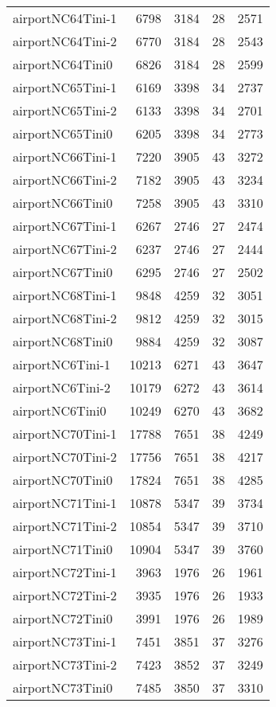 \begin{longtable}{lrrrr}
airportNC64Tini-1 & 6798 & 3184 & 28 & 2571 \\
airportNC64Tini-2 & 6770 & 3184 & 28 & 2543 \\
airportNC64Tini0 & 6826 & 3184 & 28 & 2599 \\
airportNC65Tini-1 & 6169 & 3398 & 34 & 2737 \\
airportNC65Tini-2 & 6133 & 3398 & 34 & 2701 \\
airportNC65Tini0 & 6205 & 3398 & 34 & 2773 \\
airportNC66Tini-1 & 7220 & 3905 & 43 & 3272 \\
airportNC66Tini-2 & 7182 & 3905 & 43 & 3234 \\
airportNC66Tini0 & 7258 & 3905 & 43 & 3310 \\
airportNC67Tini-1 & 6267 & 2746 & 27 & 2474 \\
airportNC67Tini-2 & 6237 & 2746 & 27 & 2444 \\
airportNC67Tini0 & 6295 & 2746 & 27 & 2502 \\
airportNC68Tini-1 & 9848 & 4259 & 32 & 3051 \\
airportNC68Tini-2 & 9812 & 4259 & 32 & 3015 \\
airportNC68Tini0 & 9884 & 4259 & 32 & 3087 \\
airportNC6Tini-1 & 10213 & 6271 & 43 & 3647 \\
airportNC6Tini-2 & 10179 & 6272 & 43 & 3614 \\
airportNC6Tini0 & 10249 & 6270 & 43 & 3682 \\
airportNC70Tini-1 & 17788 & 7651 & 38 & 4249 \\
airportNC70Tini-2 & 17756 & 7651 & 38 & 4217 \\
airportNC70Tini0 & 17824 & 7651 & 38 & 4285 \\
airportNC71Tini-1 & 10878 & 5347 & 39 & 3734 \\
airportNC71Tini-2 & 10854 & 5347 & 39 & 3710 \\
airportNC71Tini0 & 10904 & 5347 & 39 & 3760 \\
airportNC72Tini-1 & 3963 & 1976 & 26 & 1961 \\
airportNC72Tini-2 & 3935 & 1976 & 26 & 1933 \\
airportNC72Tini0 & 3991 & 1976 & 26 & 1989 \\
airportNC73Tini-1 & 7451 & 3851 & 37 & 3276 \\
airportNC73Tini-2 & 7423 & 3852 & 37 & 3249 \\
airportNC73Tini0 & 7485 & 3850 & 37 & 3310 \\

\end{longtable}
